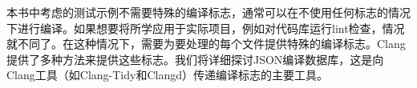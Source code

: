 本书中考虑的测试示例不需要特殊的编译标志，通常可以在不使用任何标志的情况下进行编译。如果想要将所学应用于实际项目，例如对代码库运行lint检查，情况就不同了。在这种情况下，需要为要处理的每个文件提供特殊的编译标志。Clang提供了多种方法来提供这些标志。我们将详细探讨JSON编译数据库，这是向Clang工具（如Clang-Tidy和Clangd）传递编译标志的主要工具。
